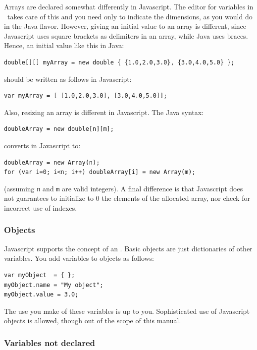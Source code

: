 Arrays are declared somewhat differently in Javascript. The editor for variables in \ejs\ takes care of this and you need only to indicate the dimensions, as you would do in the Java flavor. However, giving an initial value to an array is different, since Javascript uses square brackets as delimiters in an array, while Java uses braces. Hence, an initial value like this in Java:
\begin{verbatim}
double[][] myArray = new double { {1.0,2.0,3.0}, {3.0,4.0,5.0} };
\end{verbatim}
\noindent should be written as follows in Javascript:
\begin{verbatim}
var myArray = [ [1.0,2.0,3.0], [3.0,4.0,5.0]];
\end{verbatim}
Also, resizing an array is different in Javascript. The Java syntax:
\begin{verbatim}
doubleArray = new double[n][m];
\end{verbatim}
\noindent converts in Javascript to:
\begin{verbatim}
doubleArray = new Array(n);
for (var i=0; i<n; i++) doubleArray[i] = new Array(m);
\end{verbatim}
\noindent (assuming \verb?n? and \verb?m? are valid integers). A final difference is that Javascript does not guarantees to initialize to 0 the elements of the allocated array, nor check for incorrect use of indexes.

\subsubsection*{Objects}

Javascript supports the concept of an . Basic objects are just dictionaries of other variables. You add variables to objects as follows:
\begin{verbatim}
var myObject  = { };
myObject.name = "My object";
myObject.value = 3.0;
\end{verbatim}
\noindent The use you make of these variables is up to you. Sophisticated use of Javascript objects is allowed, though out of the scope of this manual.

\subsubsection*{Variables not declared}

